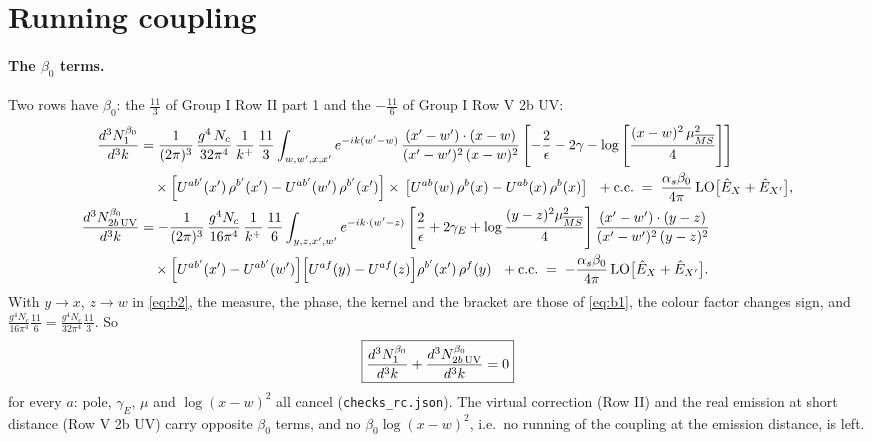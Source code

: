 \documentclass[9pt]{article}
\numberwithin{equation}{section}
\begin{document}
\section{Running coupling}\label{sec:rc}
\paragraph{The $\beta_0$ terms.} Two rows have $\beta_0$: the $\frac{11}{3}$ of Group I Row II part 1 and the $-\frac{11}{6}$ of Group I Row V 2b UV:
\begin{align}
\frac{d^{3}N^{\beta_0}_{1}}{d^{3}k}&=\frac{1}{(2\pi)^{3}}\,\frac{g^{4}\,N_{c}}{32\pi^{4}}\,\frac{1}{k^{+}}\,\frac{11}{3}\int_{w,w',x,x'}e^{-ik(w'-w)}\,\frac{(x'-w')\cdot (x-w)}{(x'-w')^{2}\, (x-w)^{2}}\left[-\frac{2}{\epsilon}-2\gamma-\log{\left[\frac{(x-w)^{2}\,\mu^{2}_{\overline{MS}}}{4}\right]}\right]\notag\\
&\quad\times\left[U^{ab'}(x')\,\rho^{b'}(x') - U^{ab'}(w')\,\rho^{b'}(x')\right]\times\,\left[U^{ab}(w)\,\rho^{b}(x) - U^{ab}(x)\,\rho^{b}(x)\right]\ \ +{\rm c.c.}\;=\;\frac{\alpha_s\beta_0}{4\pi}\,{\rm LO}\big[\hat E_X+\hat E_{X'}\big],\label{eq:b1}\\
\frac{d^{3}N^{\beta_0}_{2b\,\rm UV}}{d^{3}k}&=-\frac{1}{(2\pi)^{3}}\,\frac{g^{4}N_{c}}{16\pi^{4}}\,\frac{1}{k^{+}}\,\frac{11}{6}\int_{y,z,x',w'}e^{-ik\cdot(w'-z)}\left[\frac{2}{\epsilon}+2\gamma_{E}+\log\frac{(y-z)^{2}\mu^{2}_{\overline{MS}}}{4}\right]\frac{(x'-w')\cdot(y-z)}{(x'-w')^{2}\,(y-z)^{2}}\notag\\
&\quad\times\Big[U^{ab'}(x')-U^{ab'}(w')\Big]\Big[U^{af}(y)-U^{af}(z)\Big]\rho^{b'}(x')\,\rho^{f}(y)\ \ +{\rm c.c.}\;=\;-\frac{\alpha_s\beta_0}{4\pi}\,{\rm LO}\big[\hat E_X+\hat E_{X'}\big].\label{eq:b2}
\end{align}
With $y\to x$, $z\to w$ in \eqref{eq:b2}, the measure, the phase, the kernel and the bracket are those of \eqref{eq:b1}, the colour factor changes sign, and $\frac{g^4N_c}{16\pi^4}\frac{11}{6}=\frac{g^4N_c}{32\pi^4}\frac{11}{3}$. So
\begin{equation}
\boxed{\frac{d^{3}N^{\beta_0}_{1}}{d^{3}k}+\frac{d^{3}N^{\beta_0}_{2b\,\rm UV}}{d^{3}k}=0}
\end{equation}
for every $a$: pole, $\gamma_E$, $\mu$ and $\log(x-w)^2$ all cancel (\texttt{checks\_rc.json}). The virtual correction (Row II) and the real emission at short distance (Row V 2b UV) carry opposite $\beta_0$ terms, and no $\beta_0\log(x-w)^2$, i.e.\ no running of the coupling at the emission distance, is left.
\end{document}
